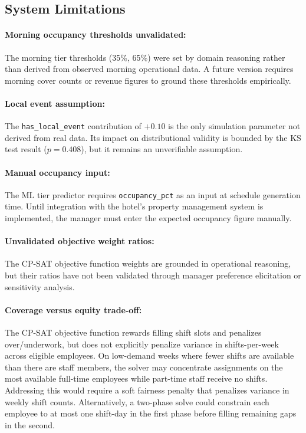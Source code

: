 \documentclass[12pt,a4paper,oneside]{article}
\begin{document}
\subsection{System Limitations}
\label{sec:systemlimits}

\paragraph{Morning occupancy thresholds unvalidated:} The morning tier thresholds (35\%, 65\%) were set by domain reasoning rather than derived from observed morning operational data. A future version requires morning cover counts or revenue figures to ground these thresholds empirically.

\paragraph{Local event assumption:} The \texttt{has\_local\_event} contribution of $+0.10$ is the only simulation parameter not derived from real data. Its impact on distributional validity is bounded by the KS test result ($p = 0.408$), but it remains an unverifiable assumption.

\paragraph{Manual occupancy input:} The ML tier predictor requires \texttt{occupancy\_pct} as an input at schedule generation time. Until integration with the hotel's property management system is implemented, the manager must enter the expected occupancy figure manually.

\paragraph{Unvalidated objective weight ratios:} The CP-SAT objective function weights are grounded in operational reasoning, but their ratios have not been validated through manager preference elicitation or sensitivity analysis.

\paragraph{Coverage versus equity trade-off:} The CP-SAT objective function rewards filling shift slots and penalizes over/underwork, but does not explicitly penalize variance in shifts-per-week across eligible employees. On low-demand weeks where fewer shifts are available than there are staff members, the solver may concentrate assignments on the most available full-time employees while part-time staff receive no shifts. Addressing this would require a soft fairness penalty that penalizes variance in weekly shift counts. Alternatively, a two-phase solve could constrain each employee to at most one shift-day in the first phase before filling remaining gaps in the second.
\newpage
\end{document}
